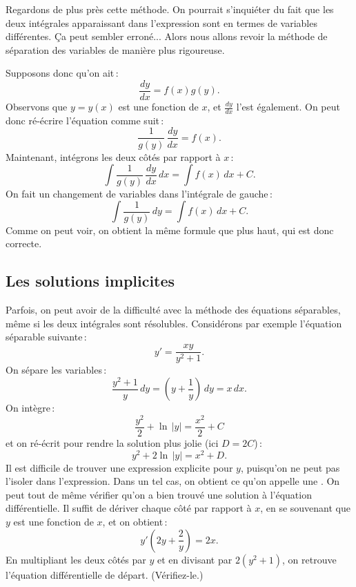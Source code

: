 Regardons de plus près cette méthode.  On pourrait s'inquiéter du fait que les deux intégrales apparaissant dans l'expression sont en termes de variables différentes.  Ça peut sembler erroné... Alors nous allons revoir la méthode de séparation des variables de manière plus rigoureuse.

Supposons donc qu'on ait\,: 
\begin{equation*}
\frac{dy}{dx} = f(x)g(y) .
\end{equation*}
Observons que 
$y = y(x)$ est une fonction de $x$, et 
$\frac{dy}{dx}$ l'est également.  On peut donc ré-écrire l'équation comme suit\,: 
\begin{equation*}
\frac{1}{g(y)}\,\frac{dy}{dx} = f(x) .
\end{equation*}
Maintenant, intégrons les deux côtés par rapport à $x$\,: 
\begin{equation*}
\int \frac{1}{g(y)}\,\frac{dy}{dx} \,dx = \int f(x) \,dx + C .
\end{equation*}
On fait un changement de variables dans l'intégrale de gauche\,: 
\begin{equation*}
\int \frac{1}{g(y)}\,dy = \int f(x) \,dx + C .
\end{equation*}
Comme on peut voir, on obtient la même formule que plus haut, qui est donc correcte.

\subsection{Les solutions implicites}

Parfois, on peut avoir de la difficulté avec la méthode des équations séparables, même si les deux intégrales sont résolubles.  Considérons par exemple l'équation séparable suivante\,: 
\begin{equation*}
y' = \frac{xy}{y^2+1} .
\end{equation*}
On sépare les variables\,: 
\begin{equation*}
\frac{y^2+1}{y}\,dy = \left(y+\frac{1}{y}\right)\,dy = x\,dx .
\end{equation*}
On intègre\,: 
\begin{equation*}
\frac{y^2}{2} + \ln \, \lvert y \rvert = \frac{x^2}{2} + C 
\end{equation*}
et on ré-écrit pour rendre la solution plus jolie (ici $D = 2C$)\,: 
\begin{equation*}
y^2 + 2 \ln \, \lvert y\rvert = x^2 + D .
\end{equation*}
Il est difficile de trouver une expression explicite pour $y$, puisqu'on ne peut pas l'isoler dans l'expression.  Dans un tel cas, on obtient ce qu'on appelle une 
\emph{}.
On peut tout de même vérifier qu'on a bien trouvé une solution à l'équation différentielle.  Il suffit de dériver chaque côté par rapport à $x$, en se souvenant que $y$ est une fonction de $x$, et on obtient\,: 
\begin{equation*}
y'\left(2y + \frac{2}{y}\right) = 2x .
\end{equation*}
En multipliant les deux côtés par $y$ et en divisant par $2(y^2+1)$, on retrouve l'équation différentielle de départ.  (Vérifiez-le.)

